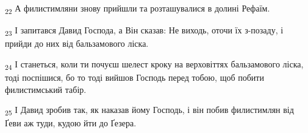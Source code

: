 \begin{tcolorbox}
\textsubscript{22} А филистимляни знову прийшли та розташувалися в долині Рефаїм.
\end{tcolorbox}
\begin{tcolorbox}
\textsubscript{23} І запитався Давид Господа, а Він сказав: Не виходь, оточи їх з-позаду, і прийди до них від бальзамового ліска.
\end{tcolorbox}
\begin{tcolorbox}
\textsubscript{24} І станеться, коли ти почуєш шелест кроку на верховіттях бальзамового ліска, тоді поспішися, бо то тоді вийшов Господь перед тобою, щоб побити филистимський табір.
\end{tcolorbox}
\begin{tcolorbox}
\textsubscript{25} І Давид зробив так, як наказав йому Господь, і він побив филистимлян від Ґеви аж туди, кудою йти до Ґезера.
\end{tcolorbox}
